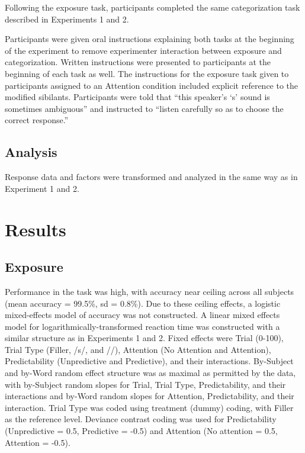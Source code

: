 Following the exposure task, participants completed the same categorization task described in Experiments 1 and 2.

Participants were given oral instructions explaining both tasks at the beginning of the experiment to remove experimenter interaction between exposure and categorization.
Written instructions were presented to participants at the beginning of each task as well.
The instructions for the exposure task given to participants assigned to an Attention condition included explicit reference to the modified sibilants.
Participants were told that ``this speaker's `s' sound is sometimes ambiguous'' and instructed to ``listen carefully so as to choose the correct response.''

\subsection{Analysis}

Response data and factors were transformed and analyzed in the same way as in Experiment 1 and 2.

\section{Results}

\subsection{Exposure}

Performance in the task was high, with accuracy near ceiling across all subjects (mean accuracy = 99.5\%, sd = 0.8\%).
Due to these ceiling effects, a logistic mixed-effects model of accuracy was not constructed.  
A linear mixed effects model for logarithmically-transformed reaction time was constructed with a similar structure as in Experiments 1 and 2.
Fixed effects were Trial (0-100), Trial Type (Filler, /s/, and /\textesh/), Attention (No Attention and Attention), Predictability (Unpredictive and Predictive), and their interactions.  
By-Subject and by-Word random effect structure was as maximal as permitted by the data, with by-Subject random slopes for Trial, Trial Type, Predictability, and their interactions and by-Word random slopes for Attention, Predictability, and their interaction. 
Trial Type was coded using treatment (dummy) coding, with Filler as the reference level. 
Deviance contrast coding was used for Predictability (Unpredictive = 0.5, Predictive = -0.5) and Attention (No attention = 0.5, Attention = -0.5).

